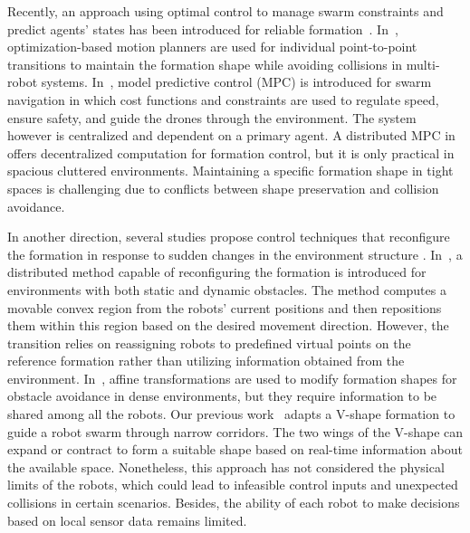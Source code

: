Recently, an approach using optimal control to manage swarm constraints and predict agents' states has been introduced for reliable formation~\cite{Beaver2021,Soria2021,8950150}. In~\cite{7828016,Wu2020}, optimization-based motion planners are used for individual point-to-point transitions to maintain the formation shape while avoiding collisions in multi-robot systems. In~\cite{Soria2021}, model predictive control (MPC) is introduced for swarm navigation in which cost functions and constraints are used to regulate speed, ensure safety, and guide the drones through the environment. The system however is centralized and dependent on a primary agent. A distributed MPC in~\cite{9562281} offers decentralized computation for formation control, but it is only practical in spacious cluttered environments. Maintaining a specific formation shape in tight spaces is challenging due to conflicts between shape preservation and collision avoidance. 

In another direction, several studies propose control techniques that reconfigure the formation in response to sudden changes in the environment structure \cite{AlonsoMora2018,9013071,9981858,10417519}. In~\cite{AlonsoMora2018}, a distributed method capable of reconfiguring the formation is introduced for environments with both static and dynamic obstacles. The method computes a movable convex region from the robots' current positions and then repositions them within this region based on the desired movement direction. However, the transition relies on reassigning robots to predefined virtual points on the reference formation rather than utilizing information obtained from the environment. In~\cite{9981858}, affine transformations are used to modify formation shapes for obstacle avoidance in dense environments, but they require information to be shared among all the robots. Our previous work~\cite{10417519} adapts a V-shape formation to guide a robot swarm through narrow corridors. The two wings of the V-shape can expand or contract to form a suitable shape based on real-time information about the available space. Nonetheless, this approach has not considered the physical limits of the robots, which could lead to infeasible control inputs and unexpected collisions in certain scenarios. Besides, the ability of each robot to make decisions based on local sensor data remains limited.

